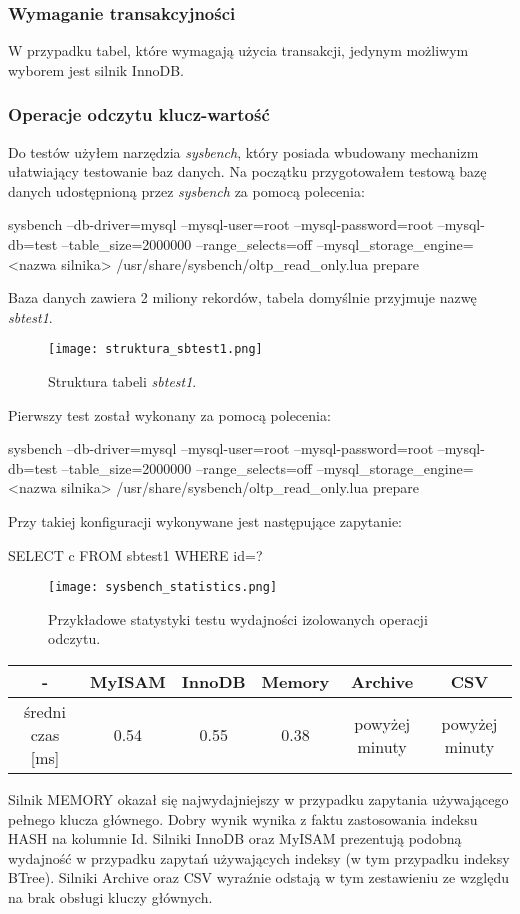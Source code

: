 \subsubsection{Wymaganie transakcyjności}
W przypadku tabel, które wymagają użycia transakcji, jedynym możliwym wyborem jest silnik InnoDB.

\subsubsection{Operacje odczytu klucz-wartość}
Do testów użyłem narzędzia \textit{sysbench}, który posiada wbudowany mechanizm ułatwiający testowanie baz danych. Na początku przygotowałem testową bazę danych udostępnioną przez \textit{sysbench} za pomocą polecenia:
\begin{spverbatim}
	sysbench --db-driver=mysql --mysql-user=root --mysql-password=root --mysql-db=test --table_size=2000000 --range_selects=off --mysql_storage_engine=<nazwa silnika> /usr/share/sysbench/oltp_read_only.lua prepare
\end{spverbatim} 
Baza danych zawiera 2 miliony rekordów, tabela domyślnie przyjmuje nazwę \textit{sbtest1}.
\begin{figure}[H]
	\caption{Struktura tabeli \textit{sbtest1}.}
	\centering
	\texttt{[image: struktura\_sbtest1.png]}
	\label{fig:label}
\end{figure}
Pierwszy test został wykonany za pomocą polecenia:
\begin{spverbatim}
	sysbench --db-driver=mysql --mysql-user=root --mysql-password=root --mysql-db=test --table_size=2000000 --range_selects=off --mysql_storage_engine=<nazwa silnika> /usr/share/sysbench/oltp_read_only.lua prepare
\end{spverbatim}
Przy takiej konfiguracji wykonywane jest następujące zapytanie:
\begin{spverbatim}
	SELECT c FROM sbtest1 WHERE id=?
\end{spverbatim}
\begin{figure}[H]
	\caption{Przykładowe statystyki testu wydajności izolowanych operacji odczytu.}
	\centering
	\texttt{[image: sysbench\_statistics.png]}
	\label{fig:label}
\end{figure}
\begin{center}
	\begin{tabular}{ | c | c | c | c | c | c |}
		\hline
		- & MyISAM & InnoDB & Memory & Archive & CSV  \\ 
		\hline
		średni czas [ms] & 0.54 & 0.55 & 0.38 & powyżej minuty & powyżej minuty \\
		\hline
	\end{tabular}
\end{center}
Silnik MEMORY okazał się najwydajniejszy w przypadku zapytania używającego pełnego klucza głównego. Dobry wynik wynika z faktu zastosowania indeksu HASH na kolumnie Id. Silniki InnoDB oraz MyISAM prezentują podobną wydajność w przypadku zapytań używających indeksy (w tym przypadku indeksy BTree). Silniki Archive oraz CSV wyraźnie odstają w tym zestawieniu ze względu na brak obsługi kluczy głównych.

